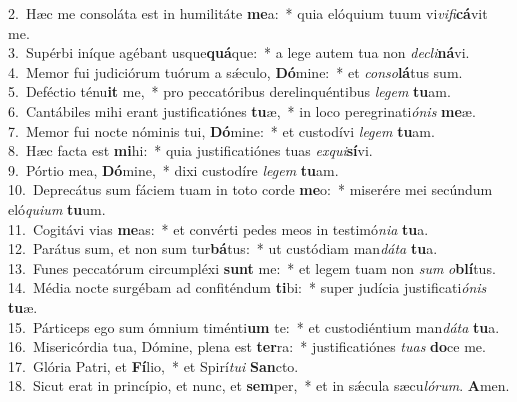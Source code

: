 {2.~}Hæc me consoláta est in humilitáte \textbf{me}a:~* quia elóquium tuum vi\textit{vi}\textit{fi}\textbf{cá}vit me.\\
{3.~}Supérbi iníque agébant usque\textbf{quá}que:~* a lege autem tua non \textit{de}\textit{cli}\textbf{ná}vi.\\
{4.~}Memor fui judiciórum tuórum a sǽculo, \textbf{Dó}mine:~* et \textit{con}\textit{so}\textbf{lá}tus sum.\\
{5.~}Deféctio ténu\textbf{it} me,~* pro peccatóribus derelinquéntibus \textit{le}\textit{gem} \textbf{tu}am.\\
{6.~}Cantábiles mihi erant justificatiónes \textbf{tu}æ,~* in loco peregrinati\textit{ó}\textit{nis} \textbf{me}æ.\\
{7.~}Memor fui nocte nóminis tui, \textbf{Dó}mine:~* et custodívi \textit{le}\textit{gem} \textbf{tu}am.\\
{8.~}Hæc facta est \textbf{mi}hi:~* quia justificatiónes tuas \textit{ex}\textit{qui}\textbf{sí}vi.\\
{9.~}Pórtio mea, \textbf{Dó}mine,~* dixi custodíre \textit{le}\textit{gem} \textbf{tu}am.\\
{10.~}Deprecátus sum fáciem tuam in toto corde \textbf{me}o:~* miserére mei secúndum eló\textit{qui}\textit{um} \textbf{tu}um.\\
{11.~}Cogitávi vias \textbf{me}as:~* et convérti pedes meos in testimó\textit{ni}\textit{a} \textbf{tu}a.\\
{12.~}Parátus sum, et non sum tur\textbf{bá}tus:~* ut custódiam man\textit{dá}\textit{ta} \textbf{tu}a.\\
{13.~}Funes peccatórum circumpléxi \textbf{sunt} me:~* et legem tuam non \textit{sum} \textit{o}\textbf{blí}tus.\\
{14.~}Média nocte surgébam ad confiténdum \textbf{ti}bi:~* super judícia justificati\textit{ó}\textit{nis} \textbf{tu}æ.\\
{15.~}Párticeps ego sum ómnium timénti\textbf{um} te:~* et custodiéntium man\textit{dá}\textit{ta} \textbf{tu}a.\\
{16.~}Misericórdia tua, Dómine, plena est \textbf{ter}ra:~* justificatiónes \textit{tu}\textit{as} \textbf{do}ce me.\\
{17.~}Glória Patri, et \textbf{Fí}lio,~* et Spirí\textit{tu}\textit{i} \textbf{San}cto.\\
{18.~}Sicut erat in princípio, et nunc, et \textbf{sem}per,~* et in sǽcula sæcu\textit{ló}\textit{rum}. \textbf{A}men.\\
